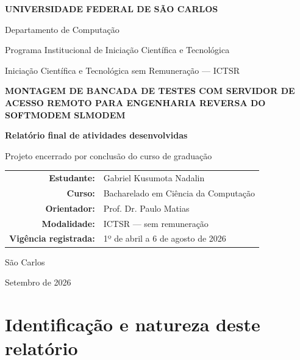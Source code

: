 \documentclass[12pt,a4paper]{article}
\begin{document}
\hypersetup{pageanchor=false}

\begin{titlepage}
  \begin{center}
    {\large\bfseries UNIVERSIDADE FEDERAL DE SÃO CARLOS\par}
    \vspace{0.25cm}
    {\large Departamento de Computação\par}
    \vspace{0.25cm}
    {\large Programa Institucional de Iniciação Científica e Tecnológica\par}
    {\large Iniciação Científica e Tecnológica sem Remuneração — ICTSR\par}

    \vfill

    {\Large\bfseries\color{azul}
      MONTAGEM DE BANCADA DE TESTES COM SERVIDOR DE ACESSO REMOTO PARA
      ENGENHARIA REVERSA DO SOFTMODEM SLMODEM\par}

    \vspace{1.4cm}
    {\large\bfseries Relatório final de atividades desenvolvidas\par}
    \vspace{0.2cm}
    {\normalsize Projeto encerrado por conclusão do curso de graduação\par}

    \vfill

    \begin{tabular}{rl}
      \textbf{Estudante:} & Gabriel Kusumota Nadalin \\
      \textbf{Curso:} & Bacharelado em Ciência da Computação \\
      \textbf{Orientador:} & Prof. Dr. Paulo Matias \\
      \textbf{Modalidade:} & ICTSR — sem remuneração \\
      \textbf{Vigência registrada:} & 1º de abril a 6 de agosto de 2026 \\
    \end{tabular}

    \vfill
    {São Carlos\par}
    {Setembro de 2026\par}
  \end{center}
\end{titlepage}

\hypersetup{pageanchor=true}

\section*{Identificação e natureza deste relatório}
\end{document}
